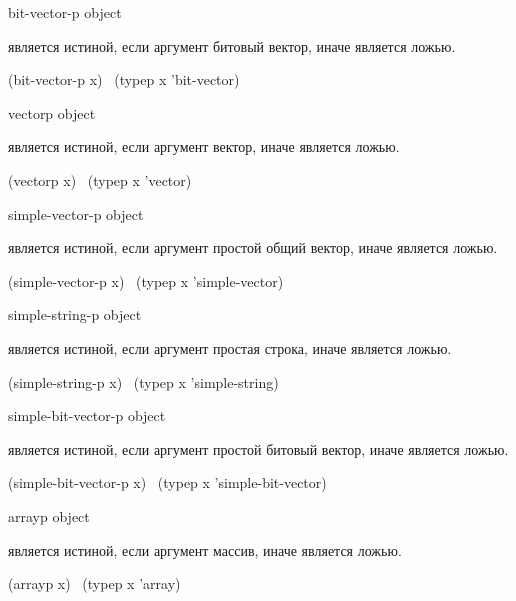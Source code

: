 \begin{defun}[Функция]
bit-vector-p object

 является истиной, если аргумент битовый вектор, иначе является ложью.
\begin{lisp}
(bit-vector-p x) \EQ\ (typep x 'bit-vector)
\end{lisp}
\end{defun}

\begin{defun}[Функция]
vectorp object

 является истиной, если аргумент вектор, иначе является ложью.
\begin{lisp}
(vectorp x) \EQ\ (typep x 'vector)
\end{lisp}
\end{defun}

\begin{defun}[Функция]
simple-vector-p object

 является истиной, если аргумент простой общий вектор, иначе
является ложью.
\begin{lisp}
(simple-vector-p x) \EQ\ (typep x 'simple-vector)
\end{lisp}
\end{defun}

\begin{defun}[Функция]
simple-string-p object

 является истиной, если аргумент простая строка, иначе
является ложью.
\begin{lisp}
(simple-string-p x) \EQ\ (typep x 'simple-string)
\end{lisp}
\end{defun}

\begin{defun}[Функция]
simple-bit-vector-p object

 является истиной, если аргумент простой битовый
вектор, иначе является ложью.
\begin{lisp}
(simple-bit-vector-p x) \EQ\ (typep x 'simple-bit-vector)
\end{lisp}
\end{defun}

\begin{defun}[Функция]
arrayp object

 является истиной, если аргумент массив, иначе является ложью.
\begin{lisp}
(arrayp x) \EQ\ (typep x 'array)
\end{lisp}
\end{defun}

